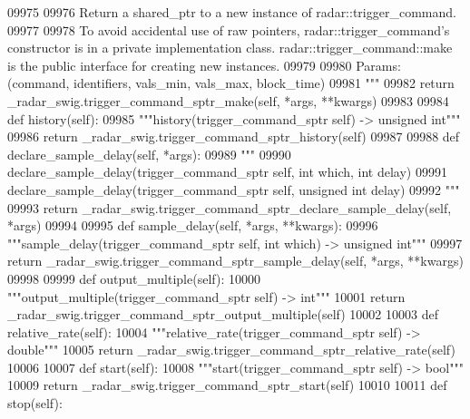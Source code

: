 \begin{DoxyCode}
{{{{{{{{{{{{{{{{{{{{{{{{{{{{{{{{09975 \textcolor{stringliteral}{}
09976 \textcolor{stringliteral}{        Return a shared\_ptr to a new instance of radar::trigger\_command.}
09977 \textcolor{stringliteral}{}
09978 \textcolor{stringliteral}{        To avoid accidental use of raw pointers, radar::trigger\_command's constructor is in a private
       implementation class. radar::trigger\_command::make is the public interface for creating new instances.}
09979 \textcolor{stringliteral}{}
09980 \textcolor{stringliteral}{        Params: (command, identifiers, vals\_min, vals\_max, block\_time)}
09981 \textcolor{stringliteral}{        """}
09982         \textcolor{keywordflow}{return} \_radar\_swig.trigger\_command\_sptr\_make(self, *args, **kwargs)
09983 
09984     \textcolor{keyword}{def }history(self):
09985         \textcolor{stringliteral}{"""history(trigger\_command\_sptr self) -> unsigned int"""}
09986         \textcolor{keywordflow}{return} \_radar\_swig.trigger\_command\_sptr\_history(self)
09987 
09988     \textcolor{keyword}{def }declare_sample_delay(self, *args):
09989         \textcolor{stringliteral}{"""}
09990 \textcolor{stringliteral}{        declare\_sample\_delay(trigger\_command\_sptr self, int which, int delay)}
09991 \textcolor{stringliteral}{        declare\_sample\_delay(trigger\_command\_sptr self, unsigned int delay)}
09992 \textcolor{stringliteral}{        """}
09993         \textcolor{keywordflow}{return} \_radar\_swig.trigger\_command\_sptr\_declare\_sample\_delay(self, *args)
09994 
09995     \textcolor{keyword}{def }sample_delay(self, *args, **kwargs):
09996         \textcolor{stringliteral}{"""sample\_delay(trigger\_command\_sptr self, int which) -> unsigned int"""}
09997         \textcolor{keywordflow}{return} \_radar\_swig.trigger\_command\_sptr\_sample\_delay(self, *args, **kwargs)
09998 
09999     \textcolor{keyword}{def }output_multiple(self):
10000         \textcolor{stringliteral}{"""output\_multiple(trigger\_command\_sptr self) -> int"""}
10001         \textcolor{keywordflow}{return} \_radar\_swig.trigger\_command\_sptr\_output\_multiple(self)
10002 
10003     \textcolor{keyword}{def }relative_rate(self):
10004         \textcolor{stringliteral}{"""relative\_rate(trigger\_command\_sptr self) -> double"""}
10005         \textcolor{keywordflow}{return} \_radar\_swig.trigger\_command\_sptr\_relative\_rate(self)
10006 
10007     \textcolor{keyword}{def }start(self):
10008         \textcolor{stringliteral}{"""start(trigger\_command\_sptr self) -> bool"""}
10009         \textcolor{keywordflow}{return} \_radar\_swig.trigger\_command\_sptr\_start(self)
10010 
10011     \textcolor{keyword}{def }stop(self):
}}}}}}}}}}}}}}}}}}}}}}}}}}}}}}}}
\end{DoxyCode}
